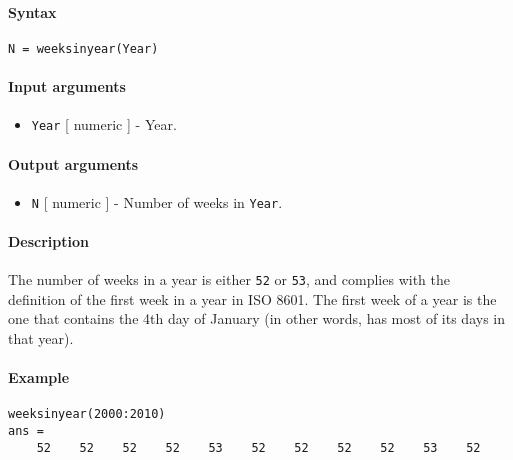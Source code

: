 


	\paragraph{Syntax}\label{syntax}

\begin{verbatim}
N = weeksinyear(Year)
\end{verbatim}

\paragraph{Input arguments}\label{input-arguments}

\begin{itemize}
\itemsep1pt\parskip0pt
\item
  \texttt{Year} {[} numeric {]} - Year.
\end{itemize}

\paragraph{Output arguments}\label{output-arguments}

\begin{itemize}
\itemsep1pt\parskip0pt
\item
  \texttt{N} {[} numeric {]} - Number of weeks in \texttt{Year}.
\end{itemize}

\paragraph{Description}\label{description}

The number of weeks in a year is either \texttt{52} or \texttt{53}, and
complies with the definition of the first week in a year in ISO 8601.
The first week of a year is the one that contains the 4th day of January
(in other words, has most of its days in that year).

\paragraph{Example}\label{example}

\begin{verbatim}
weeksinyear(2000:2010)
ans =
    52    52    52    52    53    52    52    52    52    53    52
\end{verbatim}


